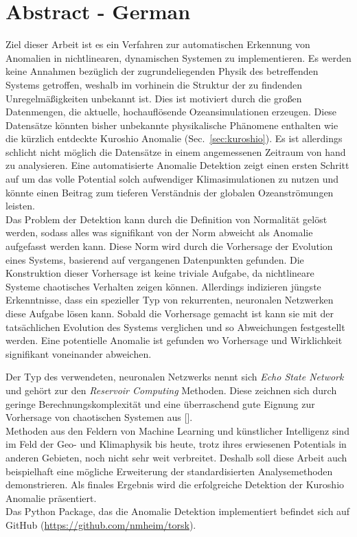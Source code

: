 \section*{Abstract - German}%
\label{sec:abstract_de}

Ziel dieser Arbeit ist es ein Verfahren zur automatischen Erkennung von
Anomalien in nichtlinearen, dynamischen Systemen zu implementieren. Es werden
keine Annahmen bez{\"u}glich der zugrundeliegenden Physik des betreffenden
Systems getroffen, weshalb im vorhinein die Struktur der zu findenden
Unregelm{\"a}{\ss}igkeiten unbekannt ist. Dies ist motiviert durch die
gro{\ss}en Datenmengen, die aktuelle, hochaufl{\"o}sende Ozeansimulationen
erzeugen. Diese Datens{\"a}tze k{\"o}nnten bisher unbekannte physikalische
Ph{\"a}nomene enthalten wie die k{\"u}rzlich entdeckte Kuroshio Anomalie
(Sec.~\ref{sec:kuroshio}).  Es ist allerdings schlicht nicht m{\"o}glich die
Datens{\"a}tze in einem angemessenen Zeitraum von hand zu analysieren.  Eine
automatisierte Anomalie Detektion zeigt einen ersten Schritt auf um das volle
Potential solch aufwendiger Klimasimulationen zu nutzen und k{\"o}nnte einen
Beitrag zum tieferen Verst{\"a}ndnis der globalen Ozeanstr{\"o}mungen
leisten.\\

Das Problem der Detektion kann durch die Definition von Normalit{\"a}t
gel{\"o}st werden, sodass alles was signifikant von der Norm abweicht als
Anomalie aufgefasst werden kann. Diese Norm wird durch die Vorhersage der
Evolution eines Systems, basierend auf vergangenen Datenpunkten gefunden. Die
Konstruktion dieser Vorhersage ist keine triviale Aufgabe, da nichtlineare
Systeme chaotisches Verhalten zeigen k{\"o}nnen. Allerdings indizieren
j{\"u}ngste Erkenntnisse, dass ein spezieller Typ von rekurrenten, neuronalen
Netzwerken diese Aufgabe l{\"o}sen kann. Sobald die Vorhersage gemacht ist kann
sie mit der tats{\"a}chlichen Evolution des Systems verglichen und so
Abweichungen festgestellt werden. Eine potentielle Anomalie ist gefunden wo
Vorhersage und Wirklichkeit signifikant voneinander abweichen.

Der Typ des verwendeten, neuronalen Netzwerks nennt sich \emph{Echo State
Network} und geh{\"o}rt zur den \emph{Reservoir Computing} Methoden. Diese
zeichnen sich durch geringe Berechnungskomplexit{\"a}t und eine
{\"u}berraschend gute Eignung zur Vorhersage von chaotischen Systemen aus
[\cite{pathak2018model}].\\

Methoden aus den Feldern von Machine Learning und k{\"u}nstlicher Intelligenz
sind im Feld der Geo- und Klimaphysik bis heute, trotz ihres erwiesenen
Potentials in anderen Gebieten, noch nicht sehr weit verbreitet. Deshalb soll
diese Arbeit auch beispielhaft eine m{\"o}gliche Erweiterung der
standardisierten Analysemethoden demonstrieren. Als finales Ergebnis wird die
erfolgreiche Detektion der Kuroshio Anomalie pr{\"a}sentiert.\\

Das Python Package, das die Anomalie Detektion implementiert befindet sich auf
GitHub (\url{https://github.com/nmheim/torsk}).
